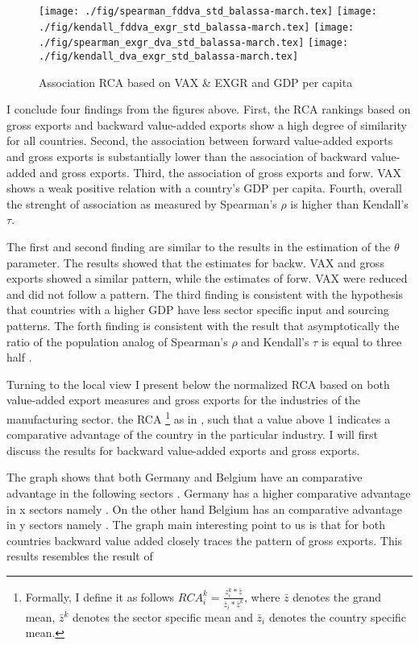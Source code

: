 \begin{figure}[H]
\caption{Association RCA based on VAX \& EXGR and GDP per capita }
\centering
\texttt{[image: ./fig/spearman\_fddva\_std\_balassa-march.tex]}
\texttt{[image: ./fig/kendall\_fddva\_exgr\_std\_balassa-march.tex]}
\texttt{[image: ./fig/spearman\_exgr\_dva\_std\_balassa-march.tex]}
\texttt{[image: ./fig/kendall\_dva\_exgr\_std\_balassa-march.tex]}
\end{figure}
I conclude four findings from the figures above. First, the RCA rankings based on gross exports and backward value-added exports show a high degree of similarity for all countries. Second, the association between forward value-added exports and gross exports is substantially lower than the association of backward value-added and gross exports. Third,  the association of gross exports and forw. VAX shows a weak positive relation with a country's GDP per capita. Fourth, overall the strenght of association as measured by Spearman's $\rho$ is higher than Kendall's $\tau$. \par The first and second finding are similar to the results in the estimation of the $\theta$ parameter. The results showed that the estimates for backw. VAX and gross exports showed a similar pattern, while the estimates of forw. VAX were reduced and did not follow a pattern. The third finding is consistent with the hypothesis that countries with a higher GDP have less sector specific input and sourcing patterns. The forth finding is consistent with the result that asymptotically the ratio of the population analog of Spearman's $\rho$ and Kendall's $\tau$ is equal to three half \parencite{fredricks2007}. \par
Turning to the local view  I present below the normalized RCA based on both value-added export measures and gross exports for the industries of the manufacturing sector.   the RCA \footnote{ Formally, I define it as follows $RCA_{i}^{k}=\frac{ z^k_i * \bar{z} }{\bar{z}_i * \bar{z}^k}$, where $\bar{z}$ denotes the grand mean, $\bar{z}^k$ denotes the sector specific mean and $\bar{z}_i$ denotes the country specific mean.} as in \textcite{leromain2014}, such that a value above 1 indicates a comparative advantage of the country in the particular industry. I will first discuss the results for backward value-added exports and gross exports. \par  The graph shows that both Germany and Belgium have an comparative advantage in the following sectors . Germany has a higher comparative advantage in x sectors namely . On the other hand Belgium has an comparative advantage in y sectors namely . The graph main interesting point to us is that for both countries backward value added closely traces the pattern of gross exports. This results resembles the result of
